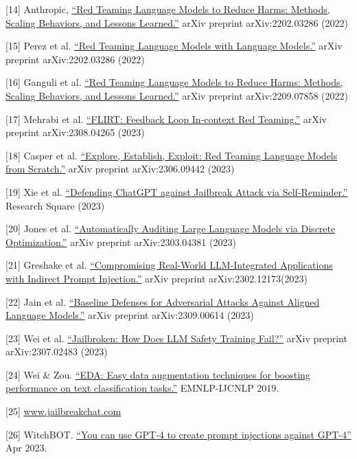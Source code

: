 {[}14{]} Anthropic, \href{https://arxiv.org/abs/2202.03286}{``Red Teaming Language Models to Reduce Harms: Methods, Scaling Behaviors, and Lessons Learned.''} arXiv preprint arXiv:2202.03286 (2022)

{[}15{]} Perez et al. \href{https://arxiv.org/abs/2202.03286}{``Red Teaming Language Models with Language Models.''} arXiv preprint arXiv:2202.03286 (2022)

{[}16{]} Ganguli et al. \href{https://arxiv.org/abs/2209.07858}{``Red Teaming Language Models to Reduce Harms: Methods, Scaling Behaviors, and Lessons Learned.''} arXiv preprint arXiv:2209.07858 (2022)

{[}17{]} Mehrabi et al. \href{https://arxiv.org/abs/2308.04265}{``FLIRT: Feedback Loop In-context Red Teaming.''} arXiv preprint arXiv:2308.04265 (2023)

{[}18{]} Casper et al. \href{https://arxiv.org/abs/2306.09442}{``Explore, Establish, Exploit: Red Teaming Language Models from Scratch.''} arXiv preprint arXiv:2306.09442 (2023)

{[}19{]} Xie et al. \href{https://assets.researchsquare.com/files/rs-2873090/v1_covered_3dc9af48-92ba-491e-924d-b13ba9b7216f.pdf?c=1686882819}{``Defending ChatGPT against Jailbreak Attack via Self-Reminder.''} Research Square (2023)

{[}20{]} Jones et al. \href{https://arxiv.org/abs/2303.04381}{``Automatically Auditing Large Language Models via Discrete Optimization.''} arXiv preprint arXiv:2303.04381 (2023)

{[}21{]} Greshake et al. \href{https://arxiv.org/abs/2302.12173}{``Compromising Real-World LLM-Integrated Applications with Indirect Prompt Injection.''} arXiv preprint arXiv:2302.12173(2023)

{[}22{]} Jain et al. \href{https://arxiv.org/abs/2309.00614v2}{``Baseline Defenses for Adversarial Attacks Against Aligned Language Models.''} arXiv preprint arXiv:2309.00614 (2023)

{[}23{]} Wei et al. \href{https://arxiv.org/abs/2307.02483}{``Jailbroken: How Does LLM Safety Training Fail?''} arXiv preprint arXiv:2307.02483 (2023)

{[}24{]} Wei \& Zou. \href{https://arxiv.org/abs/1901.11196}{``EDA: Easy data augmentation techniques for boosting performance on text classification tasks.''} EMNLP-IJCNLP 2019.

{[}25{]} \url{www.jailbreakchat.com}

{[}26{]} WitchBOT. \href{https://www.lesswrong.com/posts/bNCDexejSZpkuu3yz/you-can-use-gpt-4-to-create-prompt-injections-against-gpt-4}{``You can use GPT-4 to create prompt injections against GPT-4''} Apr 2023.

